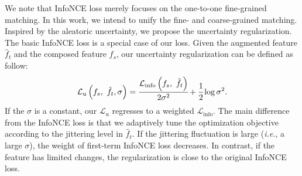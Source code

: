 \documentclass[10pt,twocolumn,letterpaper]{article}
\def\ie{\emph{i.e.}}
\begin{document}
We note that InfoNCE loss merely focuses on the one-to-one fine-grained matching. In this work, we intend to unify the fine- and coarse-grained matching. Inspired by the aleatoric uncertainty, we propose the uncertainty regularization. The basic InfoNCE loss is a special case of our loss. Given the augmented feature $\hat{f}_t$ and the composed feature $f_s$, our uncertainty regularization can be defined as follow: \vspace{-2mm}
\begin{equation}
    \mathcal{L}_{\mathrm{u}}\left( f_s,\ \hat{f_t}, \sigma \right)= \cfrac{\mathcal{L}_{\mathrm{info}}\left( f_s,\ \hat{f_t} \right)}{2 \sigma^{2}} +\cfrac{1}{2} \log \sigma^{2}.
\label{eq:uncertain}\vspace{-1mm}
\end{equation}
If the $\sigma$ is a constant, our $\mathcal{L}_{\mathrm{u}}$ regresses to a weighted $\mathcal{L}_{\mathrm{info}}$. 
The main difference from the InfoNCE loss is that we adaptively tune the optimization objective according to the jittering level in $\hat{f}_t$. If the jittering fluctuation is large (\ie, a large $\sigma$), the weight of first-term InfoNCE loss decreases. In contrast, if the feature has limited changes, the regularization is close to the original InfoNCE loss.  
\end{document}
